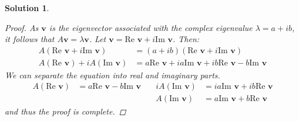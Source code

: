 \documentclass[11pt]{scrartcl}
\theoremstyle{dotlessP}
\newtheorem{sol}{Solution}[section]
\theoremstyle{dotlessN}
\begin{document}
\begin{sol}
	\begin{proof}
		As $\bm{v}$ is the eigenvector associated with the complex eigenvalue $\lambda = a + ib$, it follows that $A\bm{v} = \lambda \bm{v}$. Let $\bm{v} = \text{Re } \bm{v} + i\text{Im } \bm{v}$. Then:
		\begin{align*}
			A(\text{Re } \bm{v} + i\text{Im } \bm{v}) &= (a+ib)(\text{Re } \bm{v} + i\text{Im } \bm{v}) \\
			A(\text{Re } \bm{v}) + iA(\text{Im } \bm{v}) &= a\text{Re }\bm{v} + ia\text{Im }\bm{v} + ib\text{Re }\bm{v} - b\text{Im }\bm{v}
		\end{align*}
		We can separate the equation into real and imaginary parts. 
		\begin{align*}
			A(\text{Re } \bm{v}) &= a \text{Re }\bm{v} - b \text{Im }\bm{v } &\quad iA(\text{Im }\bm{v}) &= ia\text{Im }\bm{v} + ib\text{Re }\bm{v} \\
								 & &\quad A(\text{Im }\bm{v}) &= a\text{Im }\bm{v} + b\text{Re }\bm{v}
		\end{align*}
		and thus the proof is complete.
	\end{proof}
\end{sol}
\end{document}
